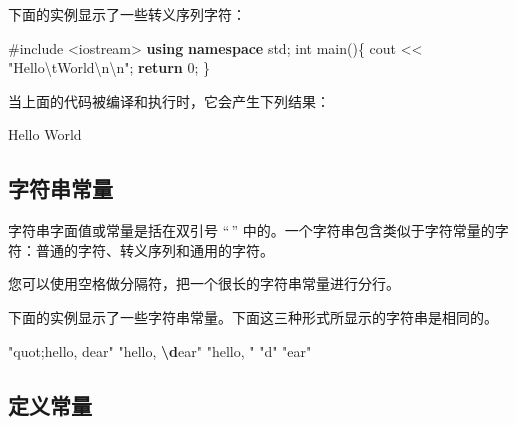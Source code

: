 \documentclass[
]{article}
\newenvironment{Shaded}{}{}
\newcommand{\ControlFlowTok}[1]{\textcolor[rgb]{0.00,0.44,0.13}{\textbf{#1}}}
\newcommand{\DataTypeTok}[1]{\textcolor[rgb]{0.56,0.13,0.00}{#1}}
\newcommand{\DecValTok}[1]{\textcolor[rgb]{0.25,0.63,0.44}{#1}}
\newcommand{\ErrorTok}[1]{\textcolor[rgb]{1.00,0.00,0.00}{\textbf{#1}}}
\newcommand{\ImportTok}[1]{#1}
\newcommand{\KeywordTok}[1]{\textcolor[rgb]{0.00,0.44,0.13}{\textbf{#1}}}
\newcommand{\NormalTok}[1]{#1}
\newcommand{\OperatorTok}[1]{\textcolor[rgb]{0.40,0.40,0.40}{#1}}
\newcommand{\PreprocessorTok}[1]{\textcolor[rgb]{0.74,0.48,0.00}{#1}}
\newcommand{\SpecialCharTok}[1]{\textcolor[rgb]{0.25,0.44,0.63}{#1}}
\newcommand{\StringTok}[1]{\textcolor[rgb]{0.25,0.44,0.63}{#1}}
\begin{document}
下面的实例显示了一些转义序列字符：

\begin{Shaded}
\begin{Highlighting}[]
\PreprocessorTok{\#include }\ImportTok{\textless{}iostream\textgreater{}}
\KeywordTok{using} \KeywordTok{namespace}\NormalTok{ std}\OperatorTok{;}
\DataTypeTok{int}\NormalTok{ main}\OperatorTok{()\{}
\NormalTok{   cout }\OperatorTok{\textless{}\textless{}} \StringTok{"Hello}\SpecialCharTok{\textbackslash{}t}\StringTok{World}\SpecialCharTok{\textbackslash{}n\textbackslash{}n}\StringTok{"}\OperatorTok{;}
   \ControlFlowTok{return} \DecValTok{0}\OperatorTok{;}
\OperatorTok{\}}
\end{Highlighting}
\end{Shaded}

当上面的代码被编译和执行时，它会产生下列结果：

\begin{Shaded}
\begin{Highlighting}[]
\NormalTok{Hello   World}
\end{Highlighting}
\end{Shaded}

\hypertarget{ux5b57ux7b26ux4e32ux5e38ux91cf}{%
\subsection{字符串常量}\label{ux5b57ux7b26ux4e32ux5e38ux91cf}}

字符串字面值或常量是括在双引号 ``\,''
中的。一个字符串包含类似于字符常量的字符：普通的字符、转义序列和通用的字符。

您可以使用空格做分隔符，把一个很长的字符串常量进行分行。

下面的实例显示了一些字符串常量。下面这三种形式所显示的字符串是相同的。

\begin{Shaded}
\begin{Highlighting}[]
\StringTok{"quot;hello, dear"}
\StringTok{"hello, }\ErrorTok{\textbackslash{}d}\StringTok{ear"}
\StringTok{"hello, "} \StringTok{"d"} \StringTok{"ear"}
\end{Highlighting}
\end{Shaded}

\hypertarget{ux5b9aux4e49ux5e38ux91cf}{%
\subsection{定义常量}\label{ux5b9aux4e49ux5e38ux91cf}}
\end{document}
